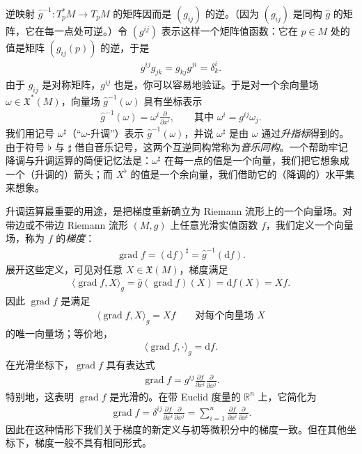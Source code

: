 \documentclass[../../main.tex]{subfiles}
\begin{document}
逆映射 $\hat g^{-1}:T_p^*M\to T_pM$ 的矩阵因而是 $(g_{ij})$ 的逆。（因为 $(g_{ij})$ 是同构 $\hat g$ 的矩阵，它在每一点处可逆。）令 $(g^{ij})$ 表示这样一个矩阵值函数：它在 $p\in M$ 处的值是矩阵 $(g_{ij}(p))$ 的逆，于是
\begin{align*}
g^{ij}g_{jk}=g_{kj}g^{ji}=\delta^i_k.
\end{align*}
由于 $g_{ij}$ 是对称矩阵，$g^{ij}$ 也是，你可以容易地验证。于是对一个余向量场 $\omega\in\mathfrak X^*(M)$，向量场 $\hat g^{-1}(\omega)$ 具有坐标表示
\begin{align*}
\hat g^{-1}(\omega)=\omega^i\frac{\partial}{\partial x^i},
\qquad\text{其中 }\omega^i=g^{ij}\omega_j.
\end{align*}
我们用记号 $\omega^\sharp$（“$\omega$-升调”）表示 $\hat g^{-1}(\omega)$，并说 $\omega^\sharp$ 是由 $\omega$ 通过\emph{升指标}得到的。由于符号 $\flat$ 与 $\sharp$ 借自音乐记号，这两个互逆同构常称为\emph{音乐同构}。一个帮助牢记降调与升调运算的简便记忆法是：$\omega^\sharp$ 在每一点的值是一个向量，我们把它想象成一个（升调的）箭头；而 $X^\flat$ 的值是一个余向量，我们借助它的（降调的）水平集来想象。

升调运算最重要的用途，是把梯度重新确立为 Riemann 流形上的一个向量场。对带边或不带边 Riemann 流形 $(M,g)$ 上任意光滑实值函数 $f$，我们定义一个向量场，称为 $f$ 的\emph{梯度}：
\begin{align*}
\operatorname{grad}f=(\mathrm{d}f)^\sharp=\hat g^{-1}(\mathrm{d}f).
\end{align*}
展开这些定义，可见对任意 $X\in\mathfrak X(M)$，梯度满足
\begin{align*}
\langle\operatorname{grad}f,X\rangle_g=\hat g(\operatorname{grad}f)(X)=\mathrm{d}f(X)=Xf.
\end{align*}
因此 $\operatorname{grad}f$ 是满足
\begin{align*}
\langle\operatorname{grad}f,X\rangle_g=Xf\qquad\text{对每个向量场 }X
\end{align*}
的唯一向量场；等价地，
\begin{align*}
\langle\operatorname{grad}f,\cdot\rangle_g=\mathrm{d}f.
\end{align*}
在光滑坐标下，$\operatorname{grad}f$ 具有表达式
\begin{align*}
\operatorname{grad}f=g^{ij}\frac{\partial f}{\partial x^i}\frac{\partial}{\partial x^j}.
\end{align*}
特别地，这表明 $\operatorname{grad}f$ 是光滑的。在带 Euclid 度量的 $\mathbb{R}^n$ 上，它简化为
\begin{align*}
\operatorname{grad}f=\delta^{ij}\frac{\partial f}{\partial x^i}\frac{\partial}{\partial x^j}
=\sum_{i=1}^n\frac{\partial f}{\partial x^i}\frac{\partial}{\partial x^i}.
\end{align*}
因此在这种情形下我们关于梯度的新定义与初等微积分中的梯度一致。但在其他坐标下，梯度一般不具有相同形式。
\end{document}
